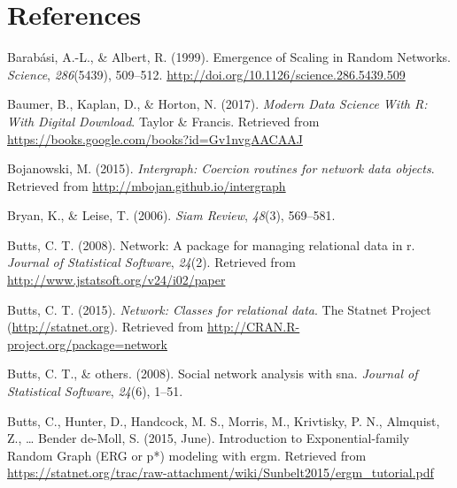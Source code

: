 \documentclass[12pt,twoside]{amherstthesis}
\begin{document}
  \singlespacing
  
  \backmatter
  
  \chapter{References}\label{references}
  
  \noindent
  
  \setlength{\parindent}{-0.20in} \setlength{\leftskip}{0.20in}
  \setlength{\parskip}{8pt}
  
  \hypertarget{refs}{}
  \hypertarget{ref-barabasi_emergence_1999}{}
  Barabási, A.-L., \& Albert, R. (1999). Emergence of Scaling in Random
  Networks. \emph{Science}, \emph{286}(5439), 509--512.
  \url{http://doi.org/10.1126/science.286.5439.509}
  
  \hypertarget{ref-baumer_modern_2017}{}
  Baumer, B., Kaplan, D., \& Horton, N. (2017). \emph{Modern Data Science
  With R: With Digital Download}. Taylor \& Francis. Retrieved from
  \url{https://books.google.com/books?id=Gv1nvgAACAAJ}
  
  \hypertarget{ref-intergraphpackagemanual}{}
  Bojanowski, M. (2015). \emph{Intergraph: Coercion routines for network
  data objects}. Retrieved from \url{http://mbojan.github.io/intergraph}
  
  \hypertarget{ref-bryan200625}{}
  Bryan, K., \& Leise, T. (2006). \emph{Siam Review}, \emph{48}(3),
  569--581.
  
  \hypertarget{ref-networkpackagearticle}{}
  Butts, C. T. (2008). Network: A package for managing relational data in
  r. \emph{Journal of Statistical Software}, \emph{24}(2). Retrieved from
  \url{http://www.jstatsoft.org/v24/i02/paper}
  
  \hypertarget{ref-networkpackagemanual}{}
  Butts, C. T. (2015). \emph{Network: Classes for relational data}. The
  Statnet Project (\url{http://statnet.org}). Retrieved from
  \url{http://CRAN.R-project.org/package=network}
  
  \hypertarget{ref-butts2008social}{}
  Butts, C. T., \& others. (2008). Social network analysis with sna.
  \emph{Journal of Statistical Software}, \emph{24}(6), 1--51.
  
  \hypertarget{ref-butts_introduction_2015}{}
  Butts, C., Hunter, D., Handcock, M. S., Morris, M., Krivtisky, P. N.,
  Almquist, Z., \ldots{} Bender de-Moll, S. (2015, June). Introduction to
  Exponential-family Random Graph (ERG or p*) modeling with ergm.
  Retrieved from
  \url{https://statnet.org/trac/raw-attachment/wiki/Sunbelt2015/ergm_tutorial.pdf}
  
\end{document}
